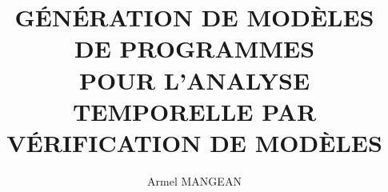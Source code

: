\documentclass[fr]{jdoc}
\title{GÉNÉRATION DE MODÈLES DE PROGRAMMES \\
  POUR L'ANALYSE TEMPORELLE PAR VÉRIFICATION DE MODÈLES}
\author{Armel MANGEAN}
\begin{document}
  
  \makehead

  
  
\end{document}
